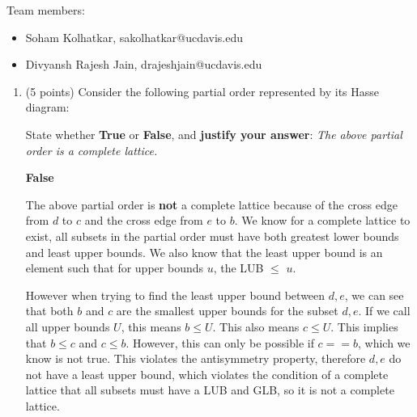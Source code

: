\documentclass[12pt]{article}
\begin{document}
\begin{mdframed}
  Team members:
  \begin{itemize}
    \item Soham Kolhatkar, sakolhatkar@ucdavis.edu %
    \item Divyansh Rajesh Jain, drajeshjain@ucdavis.edu %
    
  \end{itemize}
\end{mdframed}
  
  \newpage
  \begin{enumerate}



\item  (5 points) Consider the following partial order represented by its Hasse diagram:
\begin{center}
\end{center}
 State whether \textbf{True} or \textbf{False},
 and \textbf{justify your answer}:
 \emph{The above partial order is a complete lattice.}
 \begin{mdframed}
    \textbf{False}

    The above partial order is \textbf{not} a complete lattice because of the cross edge from $d$ to $c$ and the cross edge from $e$ to $b$. We know for a complete lattice to exist, all subsets in the partial order must have both greatest lower bounds and least upper bounds. We also know that the least upper bound is an element such that for upper bounds $u$, the LUB $\leq$ $u$.
    
    However when trying to find the least upper bound between $d,e$, we can see that both $b$ and $c$ are the smallest upper bounds for the subset $d,e$. If we call all upper bounds $U$, this means  $b \leq U$. This also means $c \leq U$. This implies that $b \leq c$ and $c \leq b$. However, this can only be possible if $c == b$, which we know is not true. This violates the antisymmetry property, therefore $d,e$ do not have a least upper bound, which violates the condition of a complete lattice that all subsets must have a LUB and GLB, so it is not a complete lattice. 
    

\end{mdframed}
\end{enumerate}
\end{document}
